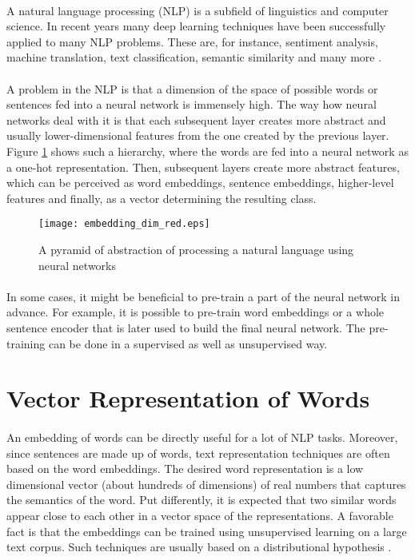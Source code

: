 \paragraph{}
A natural language processing (NLP) is a subfield of linguistics and computer science. In recent years many deep learning techniques have been successfully applied to many NLP problems. These are, for instance, sentiment analysis, machine translation, text classification, semantic similarity and many more \cite{nlp_devopedia}. 

\paragraph{}
A problem in the NLP is that a dimension of the space of possible words or sentences fed into a neural network is immensely high. The way how neural networks deal with it is that each subsequent layer creates more abstract and usually lower-dimensional features from the one created by the previous layer. Figure \ref{embedding_dim_red_figure} shows such a hierarchy, where the words are fed into a neural network as a one-hot representation. Then, subsequent layers create more abstract features, which can be perceived as word embeddings, sentence embeddings, higher-level features and finally, as a vector determining the resulting class.

\begin{figure}[!h]
	\texttt{[image: embedding\_dim\_red.eps]}
	\centering
	\caption{A pyramid of abstraction of processing a natural language using neural networks}
	\label{embedding_dim_red_figure}
\end{figure}

\paragraph{}
In some cases, it might be beneficial to pre-train a part of the neural network in advance. For example, it is possible to pre-train word embeddings or a whole sentence encoder that is later used to build the final neural network. The pre-training can be done in a supervised as well as unsupervised way.

\section{Vector Representation of Words}\label{word_embedding}
\paragraph{}
An embedding of words can be directly useful for a lot of NLP tasks. Moreover, since sentences are made up of words, text representation techniques are often based on the word embeddings. The desired word representation is a low dimensional vector (about hundreds of dimensions) of real numbers that captures the semantics of the word. Put differently, it is expected that two similar words appear close to each other in a vector space of the representations. A favorable fact is that the embeddings can be trained using unsupervised learning on a large text corpus. Such techniques are usually based on a distributional hypothesis \cite{nlp_eisenstein}.

